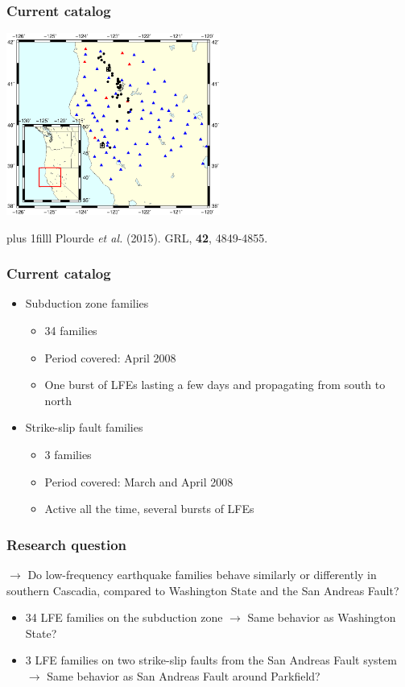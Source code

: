 \documentclass{beamer}
\newcommand{\btVFill}{\vskip0pt plus 1filll}
\begin{document}
	\begin{frame}
		\frametitle{Current catalog}
		\begin{center}
			\includegraphics[trim={1cm 3cm 1cm 10cm}, clip, width=7cm]{catalog_SC/families_map.eps}
		\end{center}
		\btVFill
		\tiny{Plourde \textit{et al.}  (2015). GRL, \textbf{42}, 4849-4855.}
	\end{frame}

	\begin{frame}
		\frametitle{Current catalog}
		\begin{itemize}
			\item Subduction zone families
			\begin{itemize}
				\item 34 families
				\item Period covered: April 2008
				\item One burst of LFEs lasting a few days and propagating from south to north
			\end{itemize}
			\item Strike-slip fault families
			\begin{itemize}
				\item 3 families
				\item Period covered: March and April 2008
				\item Active all the time, several bursts of LFEs
			\end{itemize}
		\end{itemize}
	\end{frame}

	\begin{frame}
		\frametitle{Research question}		
		\begin{block}{}
			$\rightarrow$ Do low-frequency earthquake families behave similarly or differently in southern Cascadia, compared to Washington State and the San Andreas Fault?
		\end{block}
		\begin{itemize}
			\item 34 LFE families on the subduction zone $\rightarrow$ Same behavior as Washington State?
			\item 3 LFE families on two strike-slip faults from the San Andreas Fault system $\rightarrow$ Same behavior as San Andreas Fault around Parkfield?
		\end{itemize}
	\end{frame}
\end{document}
